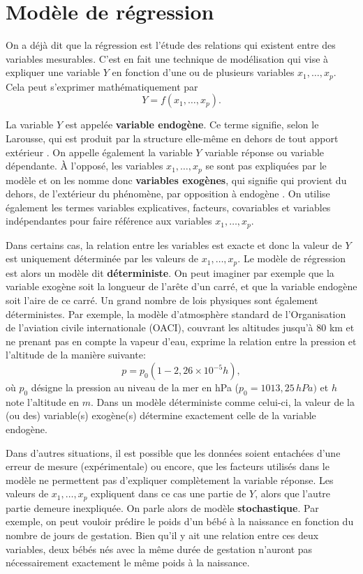 \section{Modèle de régression}

On a déjà dit que la régression est l'étude des relations qui existent entre des variables mesurables. C'est en fait une technique de modélisation qui vise à expliquer une variable $Y$ en fonction d'une ou de plusieurs variables $x_1,\ldots,x_p$. Cela peut s'exprimer mathématiquement par
\begin{equation}
Y=f(x_1,\ldots,x_p).
\end{equation}

La variable $Y$ est appel\'ee \textbf{variable endogène}. Ce terme signifie, selon le Larousse, \og qui est produit par la structure elle-même en dehors de tout apport extérieur \fg . On appelle également la variable $Y$ variable réponse ou variable dépendante. À l'opposé, les variables $x_1,\ldots,x_p$ se sont pas expliquées par le modèle et on les nomme donc \textbf{variables exogènes}, qui signifie \og qui provient du dehors, de l'extérieur du phénomène, par opposition à endogène \fg. On utilise également les termes variables explicatives, facteurs, covariables et variables indépendantes pour faire référence aux variables $x_1,\ldots,x_p$.


Dans certains cas, la relation entre les variables est exacte et donc la valeur de $Y$ est uniquement déterminée par les valeurs de $x_1,\ldots,x_p$. Le mod\`ele de r\'egression est alors un modèle dit \textbf{déterministe}. On peut imaginer par exemple que la variable exogène soit la longueur de l'arête d'un carré, et que la variable endogène soit l'aire de ce carré. Un grand nombre de lois physiques sont également déterministes. Par exemple, la modèle d'atmosphère standard de l'Organisation de l'aviation civile internationale (OACI), couvrant les altitudes jusqu'à 80 km et ne prenant pas en compte la vapeur d'eau, exprime la relation entre la pression et l'altitude de la manière suivante:
$$p=p_0(1-2,26\times10^{-5}h),$$ où $p_0$ désigne la pression au niveau de la mer en hPa ($p_0=1013,25\,hPa)$ et $h$ note l'altitude en $m$. Dans un modèle déterministe comme celui-ci, la valeur de la (ou des) variable(s) exogène(s) détermine exactement celle de la variable endogène.


Dans d'autres situations, il est possible que les données soient entachées d'une erreur de mesure (expérimentale) ou encore, que les facteurs utilisés dans le modèle ne permettent pas d'expliquer complètement la variable réponse. Les valeurs de $x_1,\ldots,x_p$ expliquent dans ce cas une partie de $Y$, alors que l'autre partie demeure inexpliquée. On parle alors de modèle \textbf{stochastique}. Par exemple, on peut vouloir prédire le poids d'un bébé à la naissance en fonction du nombre de jours de gestation. Bien qu'il y ait une relation entre ces deux variables,  deux bébés nés avec la même durée de gestation n'auront pas nécessairement exactement le même poids à la naissance.

